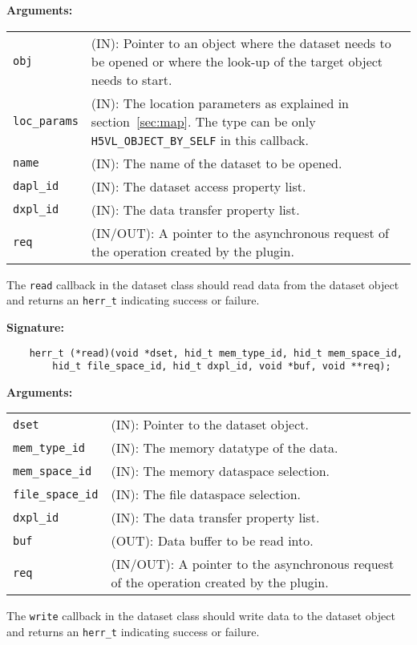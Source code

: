 \textbf{Arguments:}\\
\begin{tabular}{l p{10cm}}
  {\tt obj} & (IN): Pointer to an object where the dataset needs to be
  opened or where the look-up of the target object needs to start.\\
  {\tt loc\_params} & (IN): The location parameters as explained in
  section~\ref{sec:map}. The type can be only {\tt
    H5VL\_OBJECT\_BY\_SELF} in this callback. \\
  {\tt name} & (IN): The name of the dataset to be opened.\\
  {\tt dapl\_id} & (IN): The dataset access property list.\\
  {\tt dxpl\_id} & (IN): The data transfer property list.\\
  {\tt req} & (IN/OUT): A pointer to the asynchronous request of the
  operation created by the plugin.\\
\end{tabular}

The {\tt read} callback in the dataset class should read data from
the dataset object and returns an {\tt herr\_t} indicating success or
failure.

\textbf{Signature:}
\begin{lstlisting}
    herr_t (*read)(void *dset, hid_t mem_type_id, hid_t mem_space_id, 
        hid_t file_space_id, hid_t dxpl_id, void *buf, void **req);
\end{lstlisting}

\textbf{Arguments:}\\
\begin{tabular}{l p{10cm}}
  {\tt dset} & (IN): Pointer to the dataset object.\\
  {\tt mem\_type\_id} & (IN): The memory datatype of the data.\\
  {\tt mem\_space\_id} & (IN): The memory dataspace selection.\\
  {\tt file\_space\_id} & (IN): The file dataspace selection.\\
  {\tt dxpl\_id} & (IN): The data transfer property list.\\
  {\tt buf} & (OUT): Data buffer to be read into.\\
  {\tt req} & (IN/OUT): A pointer to the asynchronous request of the
  operation created by the plugin.\\
\end{tabular}

The {\tt write} callback in the dataset class should write data to
the dataset object and returns an {\tt herr\_t} indicating success or
failure.


